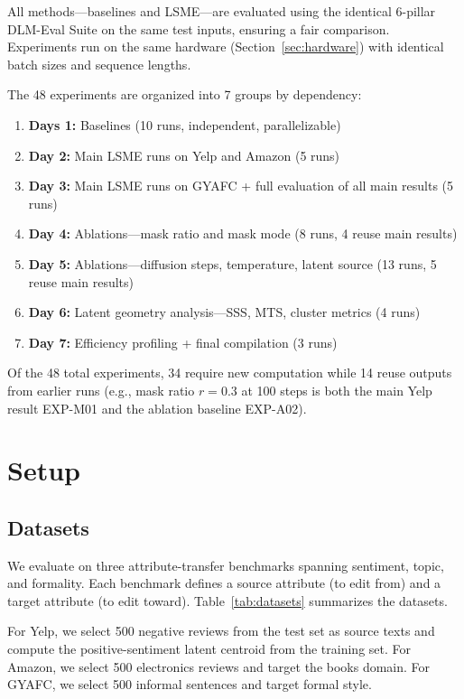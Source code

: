 \documentclass{article}
\begin{document}
All methods---baselines and LSME---are evaluated using the identical 6-pillar DLM-Eval Suite on the same test inputs, ensuring a fair comparison. Experiments run on the same hardware (Section~\ref{sec:hardware}) with identical batch sizes and sequence lengths.

The 48 experiments are organized into 7 groups by dependency:
\begin{enumerate}
  \item \textbf{Days 1:} Baselines (10 runs, independent, parallelizable)
  \item \textbf{Day 2:} Main LSME runs on Yelp and Amazon (5 runs)
  \item \textbf{Day 3:} Main LSME runs on GYAFC + full evaluation of all main results (5 runs)
  \item \textbf{Day 4:} Ablations---mask ratio and mask mode (8 runs, 4 reuse main results)
  \item \textbf{Day 5:} Ablations---diffusion steps, temperature, latent source (13 runs, 5 reuse main results)
  \item \textbf{Day 6:} Latent geometry analysis---SSS, MTS, cluster metrics (4 runs)
  \item \textbf{Day 7:} Efficiency profiling + final compilation (3 runs)
\end{enumerate}

\noindent Of the 48 total experiments, 34 require new computation while 14 reuse outputs from earlier runs (e.g., mask ratio $r=0.3$ at 100 steps is both the main Yelp result EXP-M01 and the ablation baseline EXP-A02).


\section{Setup}
\label{sec:setup}

\subsection{Datasets}

We evaluate on three attribute-transfer benchmarks spanning sentiment, topic, and formality. Each benchmark defines a source attribute (to edit from) and a target attribute (to edit toward). Table~\ref{tab:datasets} summarizes the datasets.

For Yelp, we select 500 negative reviews from the test set as source texts and compute the positive-sentiment latent centroid from the training set. For Amazon, we select 500 electronics reviews and target the books domain. For GYAFC, we select 500 informal sentences and target formal style.
\end{document}
